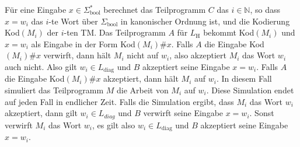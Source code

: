 \documentclass[a4paper,ngerman,12pt]{exam}
\begin{document}
\begin{questions}
\begin{parts}
{\begin{solutionorbox}


  Für eine Eingabe $x \in \Sigma^*_{\mathrm{bool}}$ berechnet das
  Teilprogramm $C$ das $i \in \mathbb{N}$, so dass $x = w_i$ das
  $i$-te Wort über $\Sigma_{\mathrm{bool}}$ in
  kanonischer Ordnung ist, und die Kodierung Kod$(M_i)$ der $i$-ten
  TM. Das Teilprogramm $A$ für $L_{\mathrm{H}}$ bekommt Kod$(M_i)$ und
  $x = w_i$ als Eingabe in der Form
  Kod$(M_i)\#x$.
  Falls $A$ die Eingabe Kod$(M_i)\#x$ verwirft,
  dann hält $M_i$ nicht auf $w_i$, also akzeptiert $M_i$
  das Wort $w_i$ auch nicht.
  Also gilt $w_i \in L_{\mathrm{diag}}$ und $B$ akzeptiert seine Eingabe $x = w_i$.
  Falls $A$ die Eingabe
  Kod$(M_i)\#x$ akzeptiert, dann hält $M_i$ auf $w_i$. In diesem Fall simuliert
  das Teilprogramm $M$ die Arbeit von $M_i$ auf $w_i$. Diese Simulation endet auf jeden Fall
  in endlicher Zeit. Falls die Simulation ergibt, dass $M_i$ das Wort $w_i$
  akzeptiert, dann gilt
  $w_i \in L_{diag}$ und $B$ verwirft seine Eingabe $x = w_i$. Sonst verwirft $M_i$
  das Wort $w_i$, es gilt
  also $w_i \in L_{\mathrm{diag}}$ und $B$ akzeptiert seine Eingabe $x = w_i$.
\end{solutionorbox}}
  \end{parts}

\end{questions}
\end{document}
